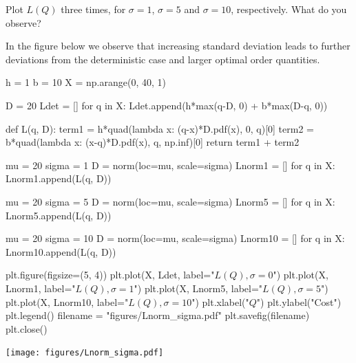 \begin{exercise}[Continuation]
Plot $L(Q)$ three times, for $\sigma=1$, $\sigma=5$ and $\sigma=10$, respectively. What do you observe?
\begin{solution}
In the figure below we observe that increasing standard deviation leads to further deviations from the deterministic case and larger optimal order quantities. 






\begin{pycode}[news]
h = 1
b = 10
X = np.arange(0, 40, 1)

D = 20
Ldet = []
for q in X:
    Ldet.append(h*max(q-D, 0) + b*max(D-q, 0))

def L(q, D):
    term1 = h*quad(lambda x: (q-x)*D.pdf(x), 0, q)[0]
    term2 = b*quad(lambda x: (x-q)*D.pdf(x), q, np.inf)[0]
    return term1 + term2


mu = 20
sigma = 1
D = norm(loc=mu, scale=sigma) 
Lnorm1 = []
for q in X:
    Lnorm1.append(L(q, D))

mu = 20
sigma = 5 
D = norm(loc=mu, scale=sigma) 
Lnorm5 = []
for q in X:
    Lnorm5.append(L(q, D))

mu = 20
sigma = 10
D = norm(loc=mu, scale=sigma) 
Lnorm10 = []
for q in X:
    Lnorm10.append(L(q, D))


plt.figure(figsize=(5, 4))
plt.plot(X, Ldet, label="$L(Q), \sigma=0$")
plt.plot(X, Lnorm1, label="$L(Q), \sigma=1$")
plt.plot(X, Lnorm5, label="$L(Q), \sigma=5$")
plt.plot(X, Lnorm10, label="$L(Q), \sigma=10$")
plt.xlabel("$Q$")
plt.ylabel("Cost")
plt.legend()
filename = "figures/Lnorm_sigma.pdf"
plt.savefig(filename)
plt.close()
\end{pycode}

\begin{center}
\texttt{[image: figures/Lnorm\_sigma.pdf]}
\end{center}


\end{solution}
\end{exercise}


